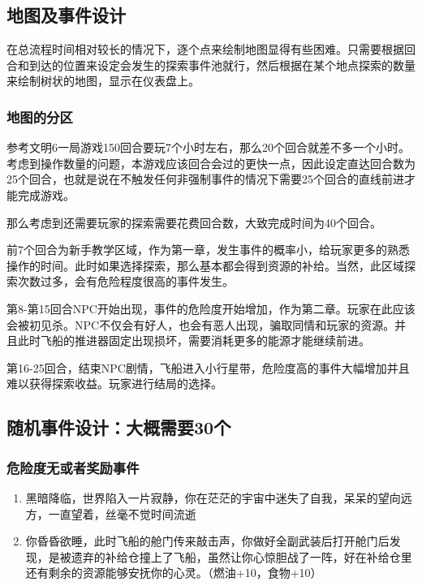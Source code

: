 \documentclass{ctexart}
\begin{document}
		\subsection{地图及事件设计}
		在总流程时间相对较长的情况下，逐个点来绘制地图显得有些困难。只需要根据回合和到达的位置来设定会发生的探索事件池就行，然后根据在某个地点探索的数量来绘制树状的地图，显示在仪表盘上。
		\subsubsection{地图的分区}
			参考文明6一局游戏150回合要玩7个小时左右，那么20个回合就差不多一个小时。考虑到操作数量的问题，本游戏应该回合会过的更快一点，因此设定直达回合数为25个回合，也就是说在不触发任何非强制事件的情况下需要25个回合的直线前进才能完成游戏。
			
			那么考虑到还需要玩家的探索需要花费回合数，大致完成时间为40个回合。
			
			前7个回合为新手教学区域，作为第一章，发生事件的概率小，给玩家更多的熟悉操作的时间。此时如果选择探索，那么基本都会得到资源的补给。当然，此区域探索次数过多，会有危险程度很高的事件发生。
			
			第8-第15回合NPC开始出现，事件的危险度开始增加，作为第二章。玩家在此应该会被初见杀。NPC不仅会有好人，也会有恶人出现，骗取同情和玩家的资源。并且此时飞船的推进器固定出现损坏，需要消耗更多的能源才能继续前进。
			
			第16-25回合，结束NPC剧情，飞船进入小行星带，危险度高的事件大幅增加并且难以获得探索收益。玩家进行结局的选择。
		\subsection{随机事件设计：大概需要30个} %
			\subsubsection{危险度无或者奖励事件}
			\begin{enumerate}
				\item 黑暗降临，世界陷入一片寂静，你在茫茫的宇宙中迷失了自我，呆呆的望向远方，一直望着，丝毫不觉时间流逝
				\item 你昏昏欲睡，此时飞船的舱门传来敲击声，你做好全副武装后打开舱门后发现，是被遗弃的补给仓撞上了飞船，虽然让你心惊胆战了一阵，好在补给仓里还有剩余的资源能够安抚你的心灵。（燃油+10，食物+10）
			\end{enumerate}
\end{document}
